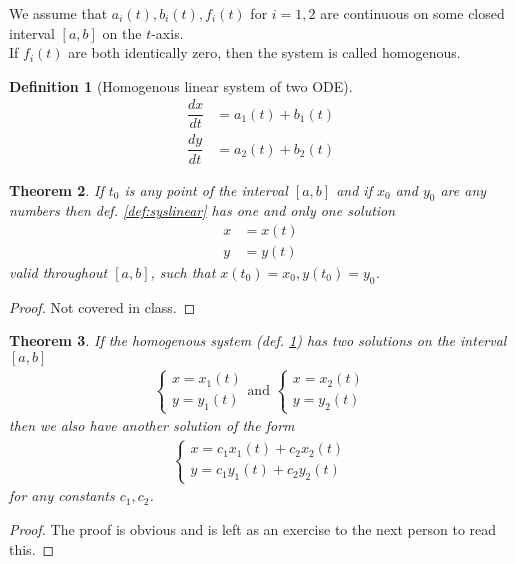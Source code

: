 \documentclass[oneside,11pt,pdftex,final]{book}%
\numberwithin{equation}{section}
\newtheorem{theorem}{Theorem}[chapter]%
\newtheorem{definition}[theorem]{Definition}
\numberwithin{section}{chapter}
\numberwithin{equation}{chapter}
\begin{document}
We assume that $ a_i(t),b_i(t),f_i(t) $ for $ i=1,2 $ are continuous on some closed interval $ [a,b] $ on the $ t$-axis.\\
If $ f_i(t) $ are both identically zero, then the system is called homogenous.
\begin{definition}[Homogenous linear system of two ODE]\label{def:homosyslinear}
	\begin{align*}
		\dfrac{dx}{dt}&=a_1(t)+b_1(t)\\
		\dfrac{dy}{dt}&=a_2(t)+b_2(t)
	\end{align*} 
\end{definition}





\begin{theorem}
	If $ t_0 $ is any point of the interval $ [a,b] $ and if $ x_0 $ and $ y_0 $ are any numbers then def. \ref{def:syslinear} has one and only one solution 
	\begin{align*}
		x&=x(t)\\
		y&=y(t)
	\end{align*}
	valid throughout $ [a,b] $, such that $ x(t_0)=x_0, y(t_0)=y_0 $.
\end{theorem}
\begin{proof}
	Not covered in class.
\end{proof}
\begin{theorem}\label{th:linearsolution}
	If the homogenous system (def. \ref{def:homosyslinear}) has two solutions on the interval $ [a,b] $
	\begin{align}\label{def:homosyslinear2soln}
		 \begin{cases}
		x=x_1(t)\\
		y=y_1(t)
	\end{cases} \text{and } \begin{cases}
		x=x_2(t)\\
		y=y_2(t)
	\end{cases}
\end{align}
	then we also have another solution of the form 
	\begin{align} \label{def:homosyslinearlinearcomb}
		\begin{cases}
		x=c_1x_1(t)+c_2x_2(t)\\
		y=c_1y_1(t)+c_2y_2(t)
	\end{cases} 
\end{align}
	for any constants $ c_1, c_2 $.
\end{theorem}
\begin{proof}
	The proof is obvious and is left as an exercise to the next person to read this.
\end{proof}
\end{document}
